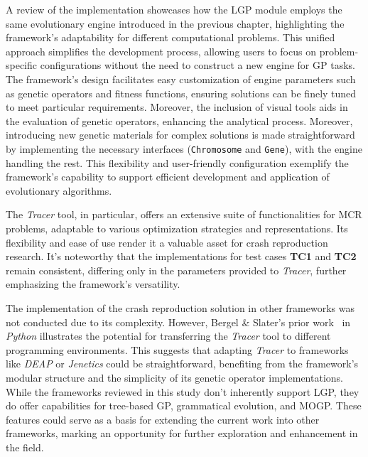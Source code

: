     A review of the implementation showcases how the LGP module employs the same evolutionary engine introduced 
    in the previous chapter, highlighting the framework's adaptability for different computational problems. This 
    unified approach simplifies the development process, allowing users to focus on problem-specific configurations 
    without the need to construct a new engine for GP tasks. The framework's design facilitates easy customization of 
    engine parameters such as genetic operators and fitness functions, ensuring solutions can be finely tuned to meet 
    particular requirements. Moreover, the inclusion of visual tools aids in the evaluation of genetic operators, 
    enhancing the analytical process. Moreover, introducing new genetic materials for complex solutions is made 
    straightforward by implementing the necessary interfaces (\texttt{Chromosome} and \texttt{Gene}), with the engine 
    handling the rest. This flexibility and user-friendly configuration exemplify the framework's capability to support 
    efficient development and application of evolutionary algorithms.

    The \textit{Tracer} tool, in particular, offers an extensive suite of functionalities for MCR problems, adaptable 
    to various optimization strategies and representations. Its flexibility and ease of use render it a valuable 
    asset for crash reproduction research. It's noteworthy that the implementations for test cases \textbf{TC1} and 
    \textbf{TC2} remain consistent, differing only in the parameters provided to \textit{Tracer}, further emphasizing 
    the framework's versatility.

    The implementation of the crash reproduction solution in other frameworks was not conducted due to its complexity. However, Bergel \& Slater's prior work~\autocite{bergelBeaconAutomatedTest2021} in \textit{Python} illustrates the potential for transferring the \textit{Tracer} tool to different programming environments. This suggests that adapting \textit{Tracer} to frameworks like \textit{DEAP} or \textit{Jenetics} could be straightforward, benefiting from the framework's modular structure and the simplicity of its genetic operator implementations. While the frameworks reviewed in this study don't inherently support LGP, they do offer capabilities for tree-based GP, grammatical evolution, and MOGP. These features could serve as a basis for extending the current work into other frameworks, marking an opportunity for further exploration and enhancement in the field.